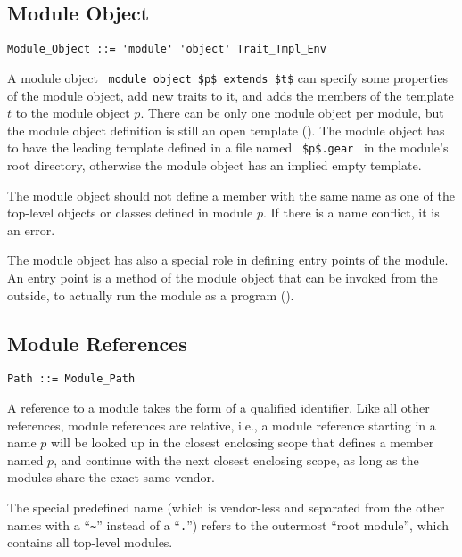 \subsection{Module Object}

\syntax\begin{lstlisting}
Module_Object ::= 'module' 'object' Trait_Tmpl_Env
\end{lstlisting}

A module object ~\lstinline!module object $p$ extends $t$! can specify some properties of the module object, add new traits to it, and adds the members of the template $t$ to the module object $p$. There can be only one module object per module, but the module object definition is still an open template (). The module object has to have the leading template defined in a file named ~\lstinline!$p$.gear!~ in the module's root directory, otherwise the module object has an implied empty template. 

The module object should not define a member with the same name as one of the top-level objects or classes defined in module $p$. If there is a name conflict, it is an error. 

The module object has also a special role in defining entry points of the module. An entry point is a method of the module object that can be invoked from the outside, to actually run the module as a program (). 






\subsection{Module References}
\label{sec:module-refs}

\syntax\begin{lstlisting}
Path ::= Module_Path
\end{lstlisting}

A reference to a module takes the form of a qualified identifier. Like all other references, module references are relative, i.e., a module reference starting in a name $p$ will be looked up in the closest enclosing scope that defines a member named $p$, and continue with the next closest enclosing scope, as long as the modules share the exact same vendor. 

The special predefined name  (which is vendor-less and separated from the other names with a ``\lstinline!~!'' instead of a ``\lstinline!.!'') refers to the outermost ``root module'', which contains all top-level modules. 

